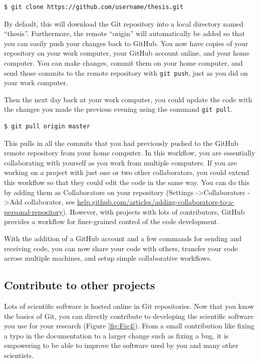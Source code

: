 \documentclass[10pt]{article}
\begin{document}
\begin{verbatim}
$ git clone https://github.com/username/thesis.git
\end{verbatim}

By default, this will download the Git repository into a local directory named ``thesis''.
Furthermore, the remote ``origin'' will automatically be added so that you can easily push your changes back to GitHub.
You now have copies of your repository on your work computer, your GitHub account online, and your home computer.
You can make changes, commit them on your home computer, and send those commits to the remote repository with \verb|git push|, just as you did on your work computer.

Then the next day back at your work computer, you could update the code with the changes you made the previous evening using the command \verb|git pull|.

\begin{verbatim}
$ git pull origin master
\end{verbatim}

This pulls in all the commits that you had previously pushed to the GitHub remote repository from your home computer.
In this workflow, you are essentially collaborating with yourself as you work from multiple computers.
If you are working on a project with just one or two other collaborators, you could extend this workflow so that they could edit the code in the same way.
You can do this by adding them as Collaborators on your repository (Settings -\textgreater Collaborators -\textgreater Add collaborator, see \href{https://help.github.com/articles/adding-collaborators-to-a-personal-repository/}{help.github.com/articles/adding-collaborators-to-a-personal-repository}).
However, with projects with lots of contributors, GitHub provides a workflow for finer-grained control of the code development.

With the addition of a GitHub account and a few commands for sending and receiving code, you can now share your code with others, transfer your code across multiple machines, and setup simple collaborative workflows.


\subsection{Contribute to other projects}

Lots of scientific software is hosted online in Git repositories.
Now that you know the basics of Git, you can directly contribute to developing the scientific software you use for your research (Figure \ref{fig:Fig4}).
From a small contribution like fixing a typo in the documentation to a larger change such as fixing a bug, it is empowering to be able to improve the software used by you and many other scientists.
\end{document}
